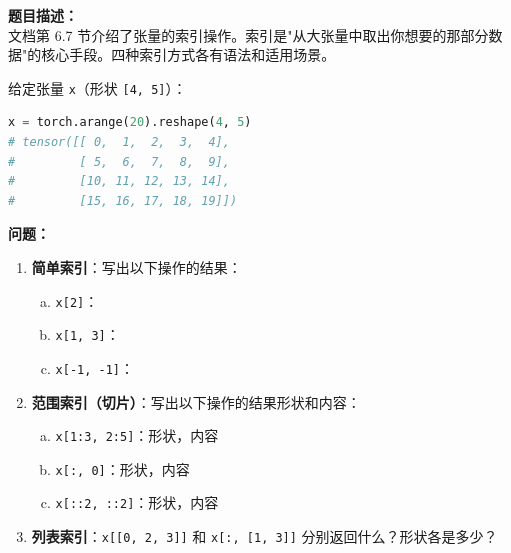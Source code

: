 \documentclass[a4paper,11pt]{ctexart}
\begin{document}
\begin{problembox}
    \textbf{题目描述：}\\
    文档第 6.7 节介绍了张量的索引操作。索引是"从大张量中取出你想要的那部分数据"的核心手段。四种索引方式各有语法和适用场景。

    \vspace{0.3cm}
    给定张量 \texttt{x}（形状 \texttt{[4, 5]}）：
    \begin{lstlisting}[language=Python]
x = torch.arange(20).reshape(4, 5)
# tensor([[ 0,  1,  2,  3,  4],
#         [ 5,  6,  7,  8,  9],
#         [10, 11, 12, 13, 14],
#         [15, 16, 17, 18, 19]])
    \end{lstlisting}

    \textbf{问题：}
    \begin{enumerate}[(1)]
        \item \textbf{简单索引}：写出以下操作的结果：
        \begin{enumerate}[a.]
            \item \texttt{x[2]}：\underline{\hspace{6cm}}
            \item \texttt{x[1, 3]}：\underline{\hspace{6cm}}
            \item \texttt{x[-1, -1]}：\underline{\hspace{6cm}}
        \end{enumerate}

        \item \textbf{范围索引（切片）}：写出以下操作的结果形状和内容：
        \begin{enumerate}[a.]
            \item \texttt{x[1:3, 2:5]}：形状\underline{\hspace{2cm}}，内容\underline{\hspace{3.5cm}}
            \item \texttt{x[:, 0]}：形状\underline{\hspace{2cm}}，内容\underline{\hspace{3.5cm}}
            \item \texttt{x[::2, ::2]}：形状\underline{\hspace{2cm}}，内容\underline{\hspace{3.5cm}}
        \end{enumerate}

        \item \textbf{列表索引}：\texttt{x[[0, 2, 3]]} 和 \texttt{x[:, [1, 3]]} 分别返回什么？形状各是多少？


\end{enumerate}
\end{problembox}
\end{document}
